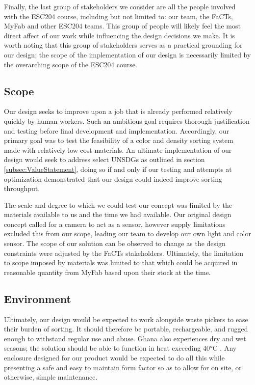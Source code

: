 \documentclass[12pt]{article}
\begin{document}
\begin{multicols*}{2}
            Finally, the last group of stakeholders we consider are all the people involved with the ESC204 course, including but not limited to: our team, the FaCTs, MyFab and other ESC204 teams. This group of people will likely feel the most direct affect of our work while influencing the design decisions we make. It is worth noting that this group of stakeholders serves as a practical grounding for our design; the scope of the implementation of our design is necessarily limited by the overarching scope of the ESC204 course. 

        \subsection{Scope}
            Our design seeks to improve upon a job that is already performed relatively quickly by human workers. Such an ambitious goal requires thorough justification and testing before final development and implementation. Accordingly, our primary goal was to test the feasibility of a color and density sorting system made with relatively low cost materials. An ultimate implementation of our design would seek to address select UNSDGs as outlined in section \ref{subsec:ValueStatement}, doing so if and only if our testing and attempts at optimization demonstrated that our design could indeed improve sorting throughput.

            The scale and degree to which we could test our concept was limited by the materials available to us and the time we had available. Our original design concept called for a camera to act as a sensor, however supply limitations excluded this from our scope, leading our team to develop our own light and color sensor. The scope of our solution can be observed to change as the design constraints were adjusted by the FaCTs stakeholders. Ultimately, the limitation to scope imposed by materials was limited to that which could be acquired in reasonable quantity from MyFab based upon their stock at the time. 

        \subsection{Environment}
            Ultimately, our design would be expected to work alongside waste pickers to ease their burden of sorting. It should therefore be portable, rechargeable, and rugged enough to withstand regular use and abuse. Ghana also experiences dry and wet seasons; the solution should be able to function in heat exceeding 40$^o$C \cite{GMET}. Any enclosure designed for our product would be expected to do all this while presenting a safe and easy to maintain form factor so as to allow for on site, or otherwise, simple maintenance. 


\end{multicols*}
\end{document}

